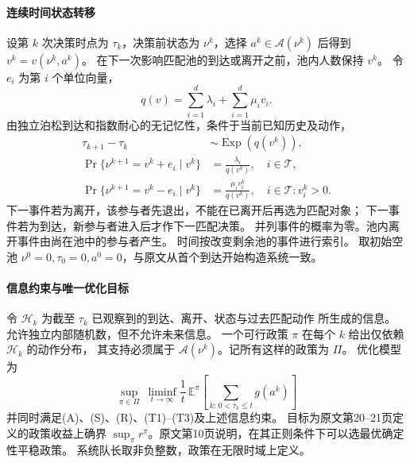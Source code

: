 \documentclass[UTF8,11pt]{ctexart}
\begin{document}
\paragraph{连续时间状态转移}
设第 $k$ 次决策时点为 $\tau_k$，决策前状态为 $\nu^k$，选择
$a^k\in\mathcal A(\nu^k)$ 后得到 $v^k=v(\nu^k,a^k)$。
在下一次影响匹配池的到达或离开之前，池内人数保持 $v^k$。
令 $e_i$ 为第 $i$ 个单位向量，
\[
q(v)=\sum_{i=1}^d\lambda_i+\sum_{i=1}^d\mu_i v_i.
\]
由独立泊松到达和指数耐心的无记忆性，条件于当前已知历史及动作，
\begin{align}
\tau_{k+1}-\tau_k&\sim\operatorname{Exp}(q(v^k)),\tag{T1}\\
\Pr\{\nu^{k+1}=v^k+e_i\mid v^k\}&=\frac{\lambda_i}{q(v^k)},\quad i\in\mathcal T,\tag{T2}\\
\Pr\{\nu^{k+1}=v^k-e_i\mid v^k\}&=\frac{\mu_i v_i^k}{q(v^k)},\quad i\in\mathcal T:v_i^k>0.\tag{T3}
\end{align}
下一事件若为离开，该参与者先退出，不能在已离开后再选为匹配对象；
下一事件若为到达，新参与者进入后才作下一匹配决策。
并列事件的概率为零。池内离开事件由尚在池中的参与者产生。
时间按改变剩余池的事件进行索引。
取初始空池 $\nu^0=0,\tau_0=0,a^0=0$，与原文从首个到达开始构造系统一致。

\paragraph{信息约束与唯一优化目标}
令 $\mathcal H_k$ 为截至 $\tau_k$ 已观察到的到达、离开、状态与过去匹配动作
所生成的信息。允许独立内部随机数，但不允许未来信息。
一个可行政策 $\pi$ 在每个 $k$ 给出仅依赖 $\mathcal H_k$ 的动作分布，
其支持必须属于 $\mathcal A(\nu^k)$。记所有这样的政策为 $\Pi$。
优化模型为
\begin{equation}
\boxed{\quad\sup_{\pi\in\Pi}\ 
\liminf_{t\to\infty}\frac1t\,
\mathbb E^{\pi}\!\left[
\sum_{k:\,0<\tau_k\le t}g(a^k)
\right]\quad}\tag{DSM-R}
\end{equation}
并同时满足(A)、(S)、(R)、(T1)--(T3)及上述信息约束。
目标为原文第20--21页定义的政策收益上确界 $\sup_\pi r^\pi$。原文第10页说明，在其正则条件下可以选最优确定性平稳政策。
系统队长取非负整数，政策在无限时域上定义。
\end{document}

